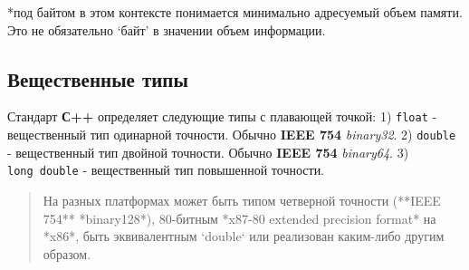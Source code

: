 *под байтом в этом контексте понимается минимально адресуемый объем
памяти. Это не обязательно `байт' в значении объем информации.

\subsection{Вещественные типы}

Стандарт \textbf{С++} определяет следующие типы с плавающей точкой: 1)
\texttt{float} - вещественный тип одинарной точности. Обычно
\textbf{IEEE 754} \emph{binary32}. 2) \texttt{double} - вещественный тип
двойной точности. Обычно \textbf{IEEE 754} \emph{binary64}. 3)
\texttt{long\ double} - вещественный тип повышенной точности.

\begin{quote}
На разных платформах может быть типом четверной точности (**IEEE 754** *binary128*), 80-битным *x87-80 extended precision format* на *x86*, быть эквивалентным `double` или реализован каким-либо другим образом.
\end{quote}
